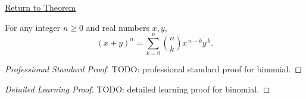 \newpage
{}
\label{prf:binomial}

\begin{remark*}[Return]
\hyperref[thm:binomial]{Return to Theorem}
\end{remark*}

\begin{theorem*}
For any integer \(n \ge 0\) and real numbers \(x,y\),
\[
(x+y)^n
=
\sum_{k=0}^{n} \binom{n}{k} x^{\,n-k} y^{\,k}.
\]
\end{theorem*}

\begin{proof}[Professional Standard Proof]
\LRAProofBodyStart
TODO: professional standard proof for binomial.
\end{proof}

\begin{proof}[Detailed Learning Proof]
\LRAProofBodyStart
TODO: detailed learning proof for binomial.
\end{proof}

\begin{remark*}
\end{remark*}

\NoLocalDependencies

\clearpage
